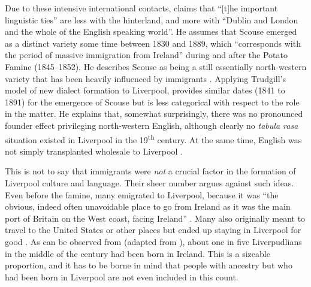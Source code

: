 Due to these intensive international contacts, \citet[15]{knowles1973} claims that ``[t]he important linguistic ties'' are less with the  hinterland, and more with ``Dublin and London and the whole of the English speaking world''.
He assumes that Scouse emerged as a distinct variety some time between 1830 and 1889, which ``corresponds with the period of massive immigration from Ireland'' \parencite[18]{knowles1973} during and after the  Potato Famine (1845--1852).
He describes Scouse as being a still essentially north-western variety that has been heavily influenced by  immigrants \parencite[cf.][51]{knowles1973}.
Applying Trudgill's model of new dialect formation \citep{trudgill1986,trudgill2004} to Liverpool, \textcite{honeybone2007} provides similar dates (1841 to 1891) for the emergence of Scouse but is less categorical with respect to the  role in the matter.
He explains that, somewhat surprisingly, there was no pronounced founder effect privileging north-western English, although clearly no \emph{tabula rasa} situation existed in Liverpool in the 19\textsuperscript{th} century.
At the same time,  English was not simply transplanted wholesale to Liverpool \citep[cf.][117 and 121]{honeybone2007}.

This is not to say that  immigrants were \emph{not} a crucial factor in the formation of Liverpool culture and language.
Their sheer number argues against such ideas.
Even before the famine, many  emigrated to Liverpool, because it was ``the obvious, indeed often unavoidable place to go from Ireland as it was the main port of Britain on the West coast, facing Ireland'' \parencite[114]{honeybone2007}.
Many also originally meant to travel to the United States or other places but ended up staying in Liverpool for good  \citep[cf.][117]{honeybone2007}.
As can be observed from  (adapted from \cite[249]{pooley2006}), about one in five Liverpudlians in the middle of the century had been born in Ireland.
This is a sizeable proportion, and it has to be borne in mind that people with  ancestry but who had been born in Liverpool are not even included in this count.


